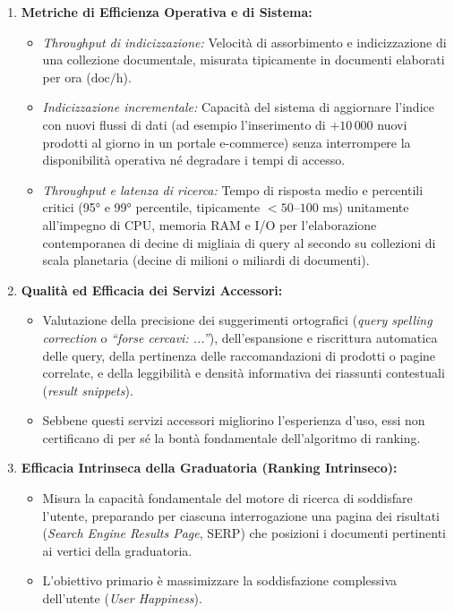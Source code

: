 \begin{enumerate}
    \item \textbf{Metriche di Efficienza Operativa e di Sistema:}
    \begin{itemize}
        \item \textit{Throughput di indicizzazione:} Velocit\`a di assorbimento e indicizzazione di una collezione documentale, misurata tipicamente in documenti elaborati per ora ($\text{doc}/\text{h}$).
        \item \textit{Indicizzazione incrementale:} Capacit\`a del sistema di aggiornare l'indice con nuovi flussi di dati (ad esempio l'inserimento di $+10\,000$ nuovi prodotti al giorno in un portale e-commerce) senza interrompere la disponibilit\`a operativa né degradare i tempi di accesso.
        \item \textit{Throughput e latenza di ricerca:} Tempo di risposta medio e percentili critici (95° e 99° percentile, tipicamente $< 50\text{--}100\text{ ms}$) unitamente all'impegno di CPU, memoria RAM e I/O per l'elaborazione contemporanea di decine di migliaia di query al secondo su collezioni di scala planetaria (decine di milioni o miliardi di documenti).
    \end{itemize}
    \item \textbf{Qualit\`a ed Efficacia dei Servizi Accessori:}
    \begin{itemize}
        \item Valutazione della precisione dei suggerimenti ortografici (\textit{query spelling correction} o \textit{``forse cercavi: ...''}), dell'espansione e riscrittura automatica delle query, della pertinenza delle raccomandazioni di prodotti o pagine correlate, e della leggibilit\`a e densit\`a informativa dei riassunti contestuali (\textit{result snippets}).
        \item Sebbene questi servizi accessori migliorino l'esperienza d'uso, essi non certificano di per sé la bont\`a fondamentale dell'algoritmo di ranking.
    \end{itemize}
    \item \textbf{Efficacia Intrinseca della Graduatoria (Ranking Intrinseco):}
    \begin{itemize}
        \item Misura la capacit\`a fondamentale del motore di ricerca di soddisfare l'utente, preparando per ciascuna interrogazione una pagina dei risultati (\textit{Search Engine Results Page}, SERP) che posizioni i documenti pertinenti ai vertici della graduatoria.
        \item L'obiettivo primario \`e massimizzare la soddisfazione complessiva dell'utente (\textit{User Happiness}).
    \end{itemize}
\end{enumerate}

